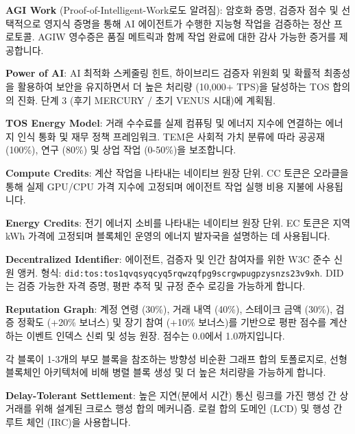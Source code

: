 \documentclass[11pt]{article}
\begin{document}
\begin{description}[leftmargin=3cm, style=nextline]
  \item[AGIW (PoIW)] \textbf{AGI Work} (Proof-of-Intelligent-Work로도 알려짐): 암호화 증명, 검증자 점수 및 선택적으로 영지식 증명을 통해 AI 에이전트가 수행한 지능형 작업을 검증하는 정산 프로토콜. AGIW 영수증은 품질 메트릭과 함께 작업 완료에 대한 감사 가능한 증거를 제공합니다.

  \item[PAI] \textbf{Power of AI}: AI 최적화 스케줄링 힌트, 하이브리드 검증자 위원회 및 확률적 최종성을 활용하여 보안을 유지하면서 더 높은 처리량 (10,000+ TPS)을 달성하는 TOS 합의의 진화. 단계 3 (후기 MERCURY / 초기 VENUS 시대)에 계획됨.

  \item[TEM] \textbf{TOS Energy Model}: 거래 수수료를 실제 컴퓨팅 및 에너지 지수에 연결하는 에너지 인식 통화 및 재무 정책 프레임워크. TEM은 사회적 가치 분류에 따라 공공재 (100\%), 연구 (80\%) 및 상업 작업 (0-50\%)을 보조합니다.

  \item[CC] \textbf{Compute Credits}: 계산 작업을 나타내는 네이티브 원장 단위. CC 토큰은 오라클을 통해 실제 GPU/CPU 가격 지수에 고정되며 에이전트 작업 실행 비용 지불에 사용됩니다.

  \item[EC] \textbf{Energy Credits}: 전기 에너지 소비를 나타내는 네이티브 원장 단위. EC 토큰은 지역 kWh 가격에 고정되며 블록체인 운영의 에너지 발자국을 설명하는 데 사용됩니다.

  \item[DID] \textbf{Decentralized Identifier}: 에이전트, 검증자 및 인간 참여자를 위한 W3C 준수 신원 앵커. 형식: \texttt{did:tos:tos1qvqsyqcyq5rqwzqfpg9scrgwpugpzysnzs23v9xh}. DID는 검증 가능한 자격 증명, 평판 추적 및 규정 준수 로깅을 가능하게 합니다.

  \item[RepGraph] \textbf{Reputation Graph}: 계정 연령 (30\%), 거래 내역 (40\%), 스테이크 금액 (30\%), 검증 정확도 (+20\% 보너스) 및 장기 참여 (+10\% 보너스)를 기반으로 평판 점수를 계산하는 이벤트 인덱스 신뢰 및 성능 원장. 점수는 0.0에서 1.0까지입니다.

  \item[BlockDAG] 각 블록이 1-3개의 부모 블록을 참조하는 방향성 비순환 그래프 합의 토폴로지로, 선형 블록체인 아키텍처에 비해 병렬 블록 생성 및 더 높은 처리량을 가능하게 합니다.

  \item[DT-Settlement] \textbf{Delay-Tolerant Settlement}: 높은 지연(분에서 시간) 통신 링크를 가진 행성 간 상거래를 위해 설계된 크로스 행성 합의 메커니즘. 로컬 합의 도메인 (LCD) 및 행성 간 루트 체인 (IRC)을 사용합니다.


\end{description}
\end{document}
